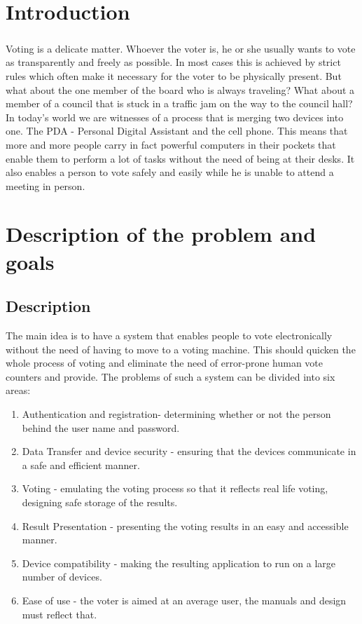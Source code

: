 \documentclass[11pt,twoside,a4paper]{book}
\begin{document}
\chapter{Introduction}

\paragraph*{}
Voting is a delicate matter. Whoever the voter is, he or she usually wants to vote as transparently and freely as possible. In most cases this is achieved by strict rules which often make it necessary for the voter to be physically present. But what about the one member of the board who is always traveling? What about a member of a council that is stuck in a traffic jam on the way to the council hall? \\
In today's world we are witnesses of a process that is merging two devices into one. The PDA - Personal Digital Assistant and the cell phone. This means that more and more people carry in fact powerful computers in their pockets that enable them to perform a lot of tasks without the need of being at their desks. It also enables a person to vote safely and easily while he is unable to attend a meeting in person. 

\chapter{Description of the problem and goals}

\section{Description}
The main idea is to have a system that enables people to vote electronically without the need of having to move to a voting machine. This should quicken the whole process of voting and eliminate the need of error-prone human vote counters and provide. The problems of such a system can be divided into six areas:
\begin{enumerate}
\item Authentication and registration- determining whether or not the person behind the user name and password.
\item Data Transfer and device security - ensuring that the devices communicate in a safe and efficient manner.
\item Voting - 	emulating the voting process so that it reflects real life voting, designing safe storage of the results.
\item Result Presentation - presenting the voting results in an easy and accessible manner.
\item Device compatibility - making the resulting application to run on a large number of devices.
\item Ease of use - the voter is aimed at an average user, the manuals and design must reflect that.
\end{enumerate}
\end{document}
